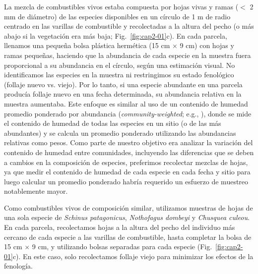 La mezcla de combustibles vivos estaba compuesta por hojas vivas y ramas ($<$ 2 mm de diámetro) de las especies disponibles en un círculo de 1 m de radio centrado en las varillas de combustible y recolectadas a la altura del pecho (o más abajo si la vegetación era más baja; Fig.~\ref{fig:cap2-01}c). En cada parcela, llenamos una pequeña bolsa plástica hermética (15 cm $\times$ 9 cm) con hojas y ramas pequeñas, haciendo que la abundancia de cada especie en la muestra fuera proporcional a su abundancia en el círculo, según una estimación visual. No identificamos las especies en la muestra ni restringimos su estado fenológico (follaje nuevo vs. viejo). Por lo tanto, si una especie abundante en una parcela producía follaje nuevo en una fecha determinada, su abundancia relativa en la muestra aumentaba. Este enfoque es similar al uso de un contenido de humedad promedio ponderado por abundancia (\textit{community-weighted}; e.g., \citealt{tiribelli_changes_2018}), donde se mide el contenido de humedad de todas las especies en un sitio (o de las más abundantes) y se calcula un promedio ponderado utilizando las abundancias relativas como pesos. Como parte de nuestro objetivo era analizar la variación del contenido de humedad entre comunidades, incluyendo las diferencias que se deben a cambios en la composición de especies, preferimos recolectar mezclas de hojas, ya que medir el contenido de humedad de cada especie en cada fecha y sitio para luego calcular un promedio ponderado habría requerido un esfuerzo de muestreo notablemente mayor.

Como combustibles vivos de composición similar, utilizamos muestras de hojas de una sola especie de \textit{Schinus patagonicus}, \textit{Nothofagus dombeyi} y \textit{Chusquea culeou}. En cada parcela, recolectamos hojas a la altura del pecho del individuo más cercano de cada especie a las varillas de combustible, hasta completar la bolsa de 15 cm $\times$ 9 cm, y utilizando bolsas separadas para cada especie (Fig.~\ref{fig:cap2-01}c). En este caso, solo recolectamos follaje viejo para minimizar los efectos de la fenología.

